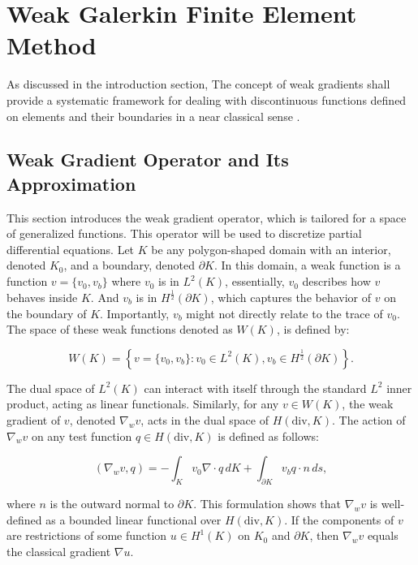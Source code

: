 \documentclass[12pt]{article} %
\begin{document}
\section{Weak Galerkin Finite Element Method}
As discussed in the introduction section, The concept of weak gradients shall provide a systematic
framework for dealing with discontinuous functions defined on elements and their boundaries in a near classical sense \cite{1}.
\subsection{Weak Gradient Operator and Its Approximation}

This section introduces the weak gradient operator, which is tailored for a space of generalized functions. This operator will be used to discretize 
partial differential equations. Let \(K\) be any polygon-shaped domain with an interior, denoted \(K_0\), and a boundary, denoted \(\partial K\). 
In this domain, a weak function is a function \(v = \{v_0, v_b\}\) where \(v_0\) is in \(L^2(K)\), essentially, \(v_0\) describes how \(v\) behaves 
inside \(K\). And \(v_b\) is in \(H^{\frac{1}{2}}(\partial K)\), which captures the behavior of \(v\) on the boundary of \(K\). 
Importantly, \(v_b\) might not directly relate to the trace of \(v_0\). The space of these weak functions denoted as \(W(K)\), is defined by:

\begin{equation}
    W(K) = \left\{ v = \{v_0, v_b\} : v_0 \in L^2(K), v_b \in H^{\frac{1}{2}}(\partial K) \right\}.
\end{equation}

The dual space of \(L^2(K)\) can interact with itself through the standard \(L^2\) inner product, acting as linear functionals. Similarly, for any \(v \in W(K)\), the weak gradient of \(v\), denoted \(\nabla_w v\), acts in the dual space of \(H(\text{div}, K)\). The action of \(\nabla_w v\) on any test function \(q \in H(\text{div}, K)\) is defined as follows:

\begin{equation}
    (\nabla_w v, q) = -\int_K v_0 \nabla \cdot q \, dK + \int_{\partial K} v_b q \cdot n \, ds,
\end{equation}

where \(n\) is the outward normal to \(\partial K\). This formulation shows that \(\nabla_w v\) is well-defined as a bounded linear functional over \(H(\text{div}, K)\). If the components of \(v\) are restrictions of some function \(u \in H^1(K)\) on \(K_0\) and \(\partial K\), then \(\nabla_w v\) equals the classical gradient \(\nabla u\).
\end{document}
